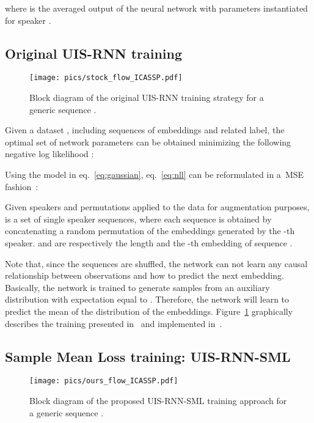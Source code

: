 \documentclass{article}
\begin{document}
where  is the averaged output of the neural network with parameters  instantiated for speaker .

\subsection{Original UIS-RNN training}
\begin{figure}[!th]
\centering
  \texttt{[image: pics/stock\_flow\_ICASSP.pdf]}
  \caption{Block diagram of the original UIS-RNN training strategy for a generic sequence .}
  \label{fig:stock_boxes}
\end{figure}

Given a dataset , including  sequences of embeddings and related label, the optimal set of network parameters  can be obtained minimizing the following negative log likelihood \cite{zhang2019fully}: 

Using the model in eq.~\ref{eq:gaussian}, eq.~\ref{eq:nll} can be reformulated in a~\ac{MSE} fashion~\cite{uisrnn-official-library}:

Given  speakers and  permutations applied to the data for augmentation purposes,  is a set of single speaker sequences, where each sequence  is obtained by concatenating a random permutation of the embeddings generated by the -th speaker.  and  are respectively the length and the -th embedding of sequence . 

Note that, since the sequences are shuffled, the network can not learn any causal relationship between observations and how to predict the next embedding. Basically, the network is trained to generate samples  from an auxiliary distribution  with expectation  equal to . Therefore, the network will learn to predict the mean of the distribution of the embeddings.
Figure~\ref{fig:stock_boxes} graphically describes the training presented in~\cite{zhang2019fully} and implemented in~\cite{uisrnn-official-library}.



\subsection{Sample Mean Loss training: UIS-RNN-SML}

\begin{figure}[!ht]
\centering
  \texttt{[image: pics/ours\_flow\_ICASSP.pdf]}
  \caption{Block diagram of the proposed UIS-RNN-SML training approach for a generic sequence .}
  \label{fig:ours_flow}
\end{figure}
\end{document}
